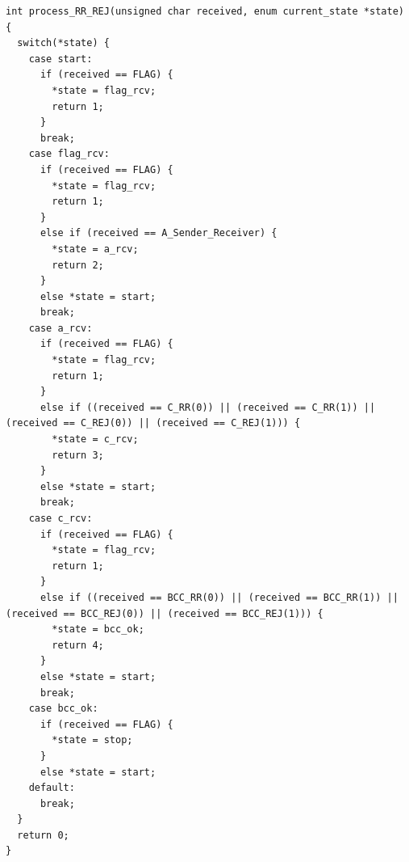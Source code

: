 \documentclass[article, a4paper, 11pt, oneside]{memoir}
\begin{document}
\begin{lstlisting}
int process_RR_REJ(unsigned char received, enum current_state *state) {
  switch(*state) {
    case start:
      if (received == FLAG) {
        *state = flag_rcv;
        return 1;
      }
      break;
    case flag_rcv:
      if (received == FLAG) {
        *state = flag_rcv;
        return 1;
      }
      else if (received == A_Sender_Receiver) {
        *state = a_rcv;
        return 2;
      }
      else *state = start;
      break;
    case a_rcv:
      if (received == FLAG) {
        *state = flag_rcv;
        return 1;
      }
      else if ((received == C_RR(0)) || (received == C_RR(1)) || (received == C_REJ(0)) || (received == C_REJ(1))) {
        *state = c_rcv;
        return 3;
      }
      else *state = start;
      break;
    case c_rcv:
      if (received == FLAG) {
        *state = flag_rcv;
        return 1;
      }
      else if ((received == BCC_RR(0)) || (received == BCC_RR(1)) || (received == BCC_REJ(0)) || (received == BCC_REJ(1))) {
        *state = bcc_ok;
        return 4;
      }
      else *state = start;
      break;
    case bcc_ok:
      if (received == FLAG) {
        *state = stop;
      }
      else *state = start;
    default:
      break;
  }
  return 0;
}
\end{lstlisting}

\newpage
\end{document}
